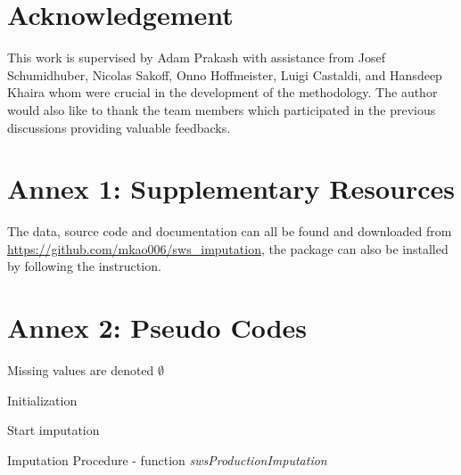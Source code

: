 \documentclass[nojss]{jss}\usepackage[]{graphicx}\usepackage[]{color}
\begin{document}
\section*{Acknowledgement}
This work is supervised by Adam Prakash with assistance from Josef
Schumidhuber, Nicolas Sakoff, Onno Hoffmeister, Luigi Castaldi, and
Hansdeep Khaira whom were crucial in the development of the
methodology. The author would also like to thank the team members
which participated in the previous discussions providing valuable
feedbacks.

\section*{Annex 1: Supplementary Resources}

The data, source code and documentation can all be found and
downloaded from \url{https://github.com/mkao006/sws_imputation}, the
package can also be installed by following the instruction. 

\FloatBarrier
\section*{Annex 2: Pseudo Codes}
     

\begin{algorithm}[H]
  \SetAlgoLined

  
  \BlankLine
  Missing values are denoted $\emptyset$\;

  \BlankLine
  Initialization\;
    
  \BlankLine  
  Start imputation\;
  \caption{Imputation Procedure - function
    \emph{swsProductionImputation}}
\end{algorithm}
\end{document}
